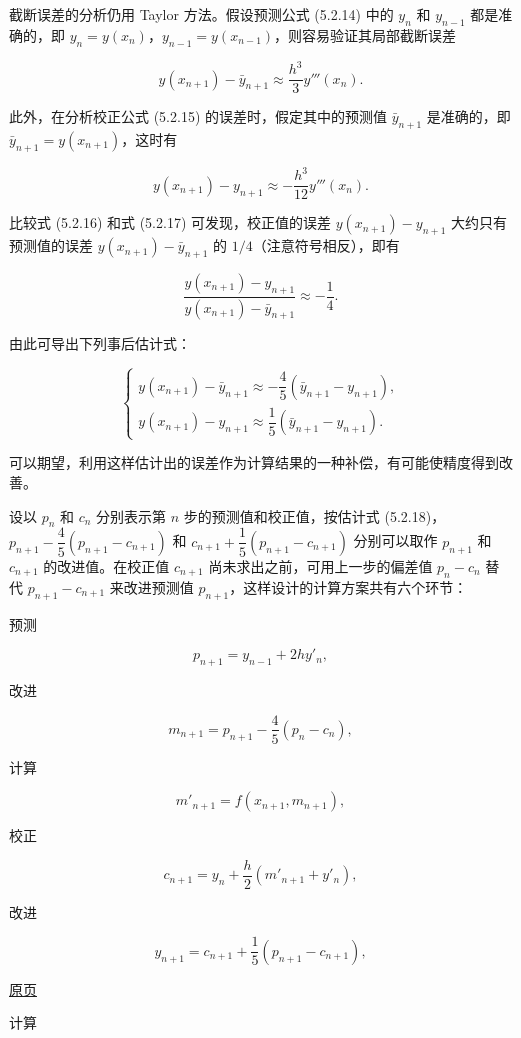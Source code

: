 \documentclass[
  10pt,
  fontset=fandol]{ctexart}
\begin{document}
截断误差的分析仍用 Taylor 方法。假设预测公式 (5.2.14) 中的 \(y_n\) 和 \(y_{n-1}\) 都是准确的，即 \(y_n=y(x_n)\)，\(y_{n-1}=y(x_{n-1})\)，则容易验证其局部截断误差

\[
y(x_{n+1})-\bar y_{n+1}\approx\frac{h^3}{3}y'''(x_n).\tag{5.2.16}
\]

此外，在分析校正公式 (5.2.15) 的误差时，假定其中的预测值 \(\bar y_{n+1}\) 是准确的，即 \(\bar y_{n+1}=y(x_{n+1})\)，这时有

\[
y(x_{n+1})-y_{n+1}\approx-\frac{h^3}{12}y'''(x_n).\tag{5.2.17}
\]

比较式 (5.2.16) 和式 (5.2.17) 可发现，校正值的误差 \(y(x_{n+1})-y_{n+1}\) 大约只有预测值的误差 \(y(x_{n+1})-\bar y_{n+1}\) 的 \(1/4\)（注意符号相反），即有

\[
\frac{y(x_{n+1})-y_{n+1}}{y(x_{n+1})-\bar y_{n+1}}\approx-\frac{1}{4}.
\]

由此可导出下列事后估计式：

\[
\begin{cases}
y(x_{n+1})-\bar y_{n+1}\approx-\dfrac{4}{5}(\bar y_{n+1}-y_{n+1}),\\
y(x_{n+1})-y_{n+1}\approx\dfrac{1}{5}(\bar y_{n+1}-y_{n+1}).
\end{cases}\tag{5.2.18}
\]

可以期望，利用这样估计出的误差作为计算结果的一种补偿，有可能使精度得到改善。

设以 \(p_n\) 和 \(c_n\) 分别表示第 \(n\) 步的预测值和校正值，按估计式 (5.2.18)，\(p_{n+1}-\dfrac{4}{5}(p_{n+1}-c_{n+1})\) 和 \(c_{n+1}+\dfrac{1}{5}(p_{n+1}-c_{n+1})\) 分别可以取作 \(p_{n+1}\) 和 \(c_{n+1}\) 的改进值。在校正值 \(c_{n+1}\) 尚未求出之前，可用上一步的偏差值 \(p_n-c_n\) 替代 \(p_{n+1}-c_{n+1}\) 来改进预测值 \(p_{n+1}\)，这样设计的计算方案共有六个环节：

预测

\[
p_{n+1}=y_{n-1}+2hy'_n,
\]

改进

\[
m_{n+1}=p_{n+1}-\frac{4}{5}(p_n-c_n),
\]

计算

\[
m'_{n+1}=f(x_{n+1},m_{n+1}),
\]

校正

\[
c_{n+1}=y_n+\frac{h}{2}(m'_{n+1}+y'_n),
\]

改进

\[
y_{n+1}=c_{n+1}+\frac{1}{5}(p_{n+1}-c_{n+1}),
\]

\href{../../source-images/pdf-126.jpeg}{原页}

计算
\end{document}

